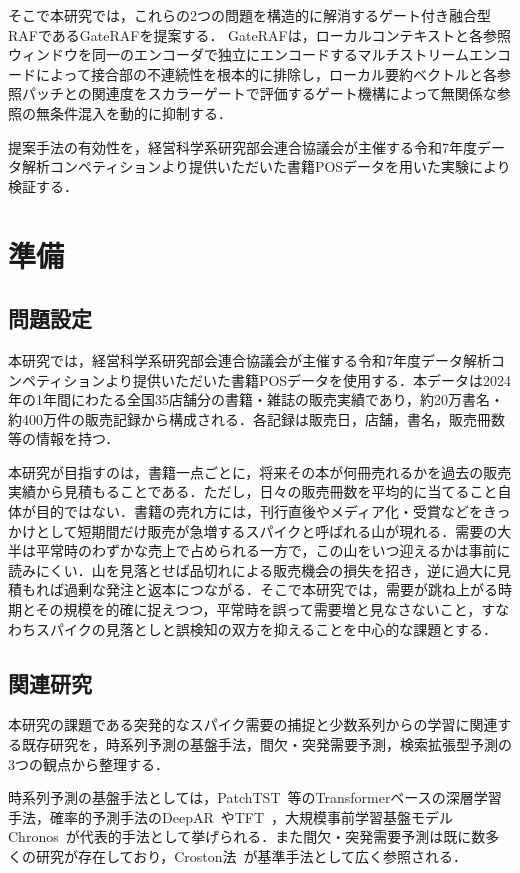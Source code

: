 \documentclass[twocolumn, lastpage]{jarticle}
\begin{document}
そこで本研究では，これらの2つの問題を構造的に解消するゲート付き融合型RAFであるGateRAFを提案する．
GateRAFは，ローカルコンテキストと各参照ウィンドウを同一のエンコーダで独立にエンコードするマルチストリームエンコードによって接合部の不連続性を根本的に排除し，ローカル要約ベクトルと各参照パッチとの関連度をスカラーゲートで評価するゲート機構によって無関係な参照の無条件混入を動的に抑制する．

提案手法の有効性を，経営科学系研究部会連合協議会が主催する令和7年度データ解析コンペティションより提供いただいた書籍POSデータを用いた実験により検証する．


\section{準備}
\subsection{問題設定}
本研究では，経営科学系研究部会連合協議会が主催する令和7年度データ解析コンペティションより提供いただいた書籍POSデータを使用する．本データは2024年の1年間にわたる全国35店舗分の書籍・雑誌の販売実績であり，約20万書名・約400万件の販売記録から構成される．各記録は販売日，店舗，書名，販売冊数等の情報を持つ．

本研究が目指すのは，書籍一点ごとに，将来その本が何冊売れるかを過去の販売実績から見積もることである．ただし，日々の販売冊数を平均的に当てること自体が目的ではない．書籍の売れ方には，刊行直後やメディア化・受賞などをきっかけとして短期間だけ販売が急増するスパイクと呼ばれる山が現れる．需要の大半は平常時のわずかな売上で占められる一方で，この山をいつ迎えるかは事前に読みにくい．山を見落とせば品切れによる販売機会の損失を招き，逆に過大に見積もれば過剰な発注と返本につながる．そこで本研究では，需要が跳ね上がる時期とその規模を的確に捉えつつ，平常時を誤って需要増と見なさないこと，すなわちスパイクの見落としと誤検知の双方を抑えることを中心的な課題とする．


\subsection{関連研究}
本研究の課題である突発的なスパイク需要の捕捉と少数系列からの学習に関連する既存研究を，時系列予測の基盤手法，間欠・突発需要予測，検索拡張型予測の3つの観点から整理する．

時系列予測の基盤手法としては，PatchTST~\cite{Nie.2023}等のTransformerベースの深層学習手法，確率的予測手法のDeepAR~\cite{Salinas.2020}やTFT~\cite{Lim.2021}，大規模事前学習基盤モデルChronos~\cite{Ansari.2024}が代表的手法として挙げられる．また間欠・突発需要予測は既に数多くの研究が存在しており，Croston法~\cite{Croston.1972}が基準手法として広く参照される．
\end{document}
